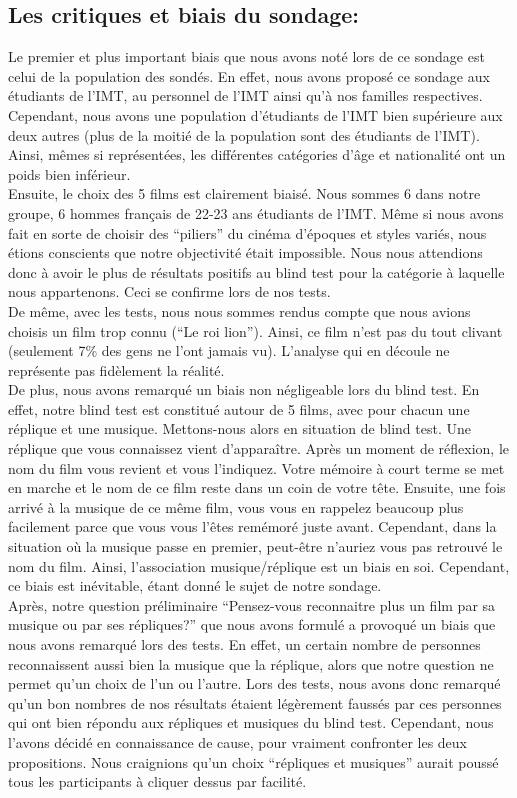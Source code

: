 \documentclass{article} %
\begin{document}
\subsection{Les critiques et biais du sondage:}
Le premier et plus important biais que nous avons noté lors de ce sondage est celui de la population des sondés. En effet, nous avons proposé ce sondage aux étudiants de l’IMT, au personnel de l’IMT ainsi qu’à nos familles respectives. Cependant, nous avons une population d’étudiants de l’IMT bien supérieure aux deux autres (plus de la moitié de la population sont des étudiants de l’IMT). Ainsi, mêmes si représentées, les différentes catégories d'âge et nationalité ont un poids bien inférieur.\\
Ensuite, le choix des 5 films est clairement biaisé. Nous sommes 6 dans notre groupe, 6 hommes français de 22-23 ans étudiants de l’IMT. Même si nous avons fait en sorte de choisir des “piliers” du cinéma d’époques et styles variés, nous étions conscients que notre objectivité était impossible. Nous nous attendions donc à avoir le plus de résultats positifs au blind test pour la catégorie à laquelle nous appartenons. Ceci se confirme lors de nos tests.\\
De même, avec les tests, nous nous sommes rendus compte que nous avions choisis un film trop connu (“Le roi lion”). Ainsi, ce film n’est pas du tout clivant (seulement 7\% des gens ne l’ont jamais vu). L’analyse qui en découle ne représente pas fidèlement la réalité.\\
De plus, nous avons remarqué un biais non négligeable lors du blind test. En effet, notre blind test est constitué autour de 5 films, avec pour chacun une réplique et une musique. Mettons-nous alors en situation de blind test. Une réplique que vous connaissez vient d’apparaître. Après un moment de réflexion, le nom du film vous revient et vous l’indiquez. Votre mémoire à court terme se met en marche et le nom de ce film reste dans un coin de votre tête. Ensuite, une fois arrivé à la musique de ce même film, vous vous en rappelez beaucoup plus facilement parce que vous vous l’êtes remémoré juste avant. Cependant, dans la situation où la musique passe en premier, peut-être n’auriez vous pas retrouvé le nom du film. Ainsi, l'association musique/réplique est un biais en soi. Cependant, ce biais est inévitable, étant donné le sujet de notre sondage.\\
Après, notre question préliminaire “Pensez-vous reconnaitre plus un film par sa musique ou par ses répliques?” que nous avons formulé a provoqué un biais que nous avons remarqué lors des tests. En effet, un certain nombre de personnes reconnaissent aussi bien la musique que la réplique, alors que notre question ne permet qu’un choix de l’un ou l’autre. Lors des tests, nous avons donc remarqué qu’un bon nombres de nos résultats étaient légèrement faussés par ces personnes qui ont bien répondu aux répliques et musiques du blind test. Cependant, nous l’avons décidé en connaissance de cause, pour vraiment confronter les deux propositions. Nous craignions qu’un choix “répliques et musiques” aurait poussé tous les participants à cliquer dessus par facilité.\\
\end{document}
